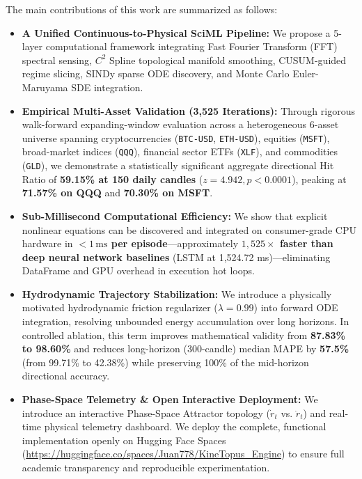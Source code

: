 \documentclass[11pt,a4paper]{article}
\begin{document}
The main contributions of this work are summarized as follows:
\begin{itemize}[leftmargin=1.5em]
    \item \textbf{A Unified Continuous-to-Physical SciML Pipeline:} We propose a 5-layer computational framework integrating Fast Fourier Transform (FFT) spectral sensing, $C^2$ Spline topological manifold smoothing, CUSUM-guided regime slicing, SINDy sparse ODE discovery, and Monte Carlo Euler-Maruyama SDE integration.
    \item \textbf{Empirical Multi-Asset Validation (3,525 Iterations):} Through rigorous walk-forward expanding-window evaluation across a heterogeneous 6-asset universe spanning cryptocurrencies (\texttt{BTC-USD}, \texttt{ETH-USD}), equities (\texttt{MSFT}), broad-market indices (\texttt{QQQ}), financial sector ETFs (\texttt{XLF}), and commodities (\texttt{GLD}), we demonstrate a statistically significant aggregate directional Hit Ratio of \textbf{59.15\% at 150 daily candles} ($z = 4.942, p < 0.0001$), peaking at \textbf{71.57\% on QQQ} and \textbf{70.30\% on MSFT}.
    \item \textbf{Sub-Millisecond Computational Efficiency:} We show that explicit nonlinear equations can be discovered and integrated on consumer-grade CPU hardware in \textbf{$<1\,\text{ms}$ per episode}---approximately \textbf{$1,525\times$ faster than deep neural network baselines} (LSTM at 1,524.72 ms)---eliminating DataFrame and GPU overhead in execution hot loops.
    \item \textbf{Hydrodynamic Trajectory Stabilization:} We introduce a physically motivated hydrodynamic friction regularizer ($\lambda = 0.99$) into forward ODE integration, resolving unbounded energy accumulation over long horizons. In controlled ablation, this term improves mathematical validity from \textbf{87.83\% to 98.60\%} and reduces long-horizon (300-candle) median MAPE by \textbf{57.5\%} (from 99.71\% to 42.38\%) while preserving 100\% of the mid-horizon directional accuracy.
    \item \textbf{Phase-Space Telemetry \& Open Interactive Deployment:} We introduce an interactive Phase-Space Attractor topology ($\dot{r}_t$ vs. $\ddot{r}_t$) and real-time physical telemetry dashboard. We deploy the complete, functional implementation openly on Hugging Face Spaces (\url{https://huggingface.co/spaces/Juan778/KineTopus_Engine}) to ensure full academic transparency and reproducible experimentation.
\end{itemize}
\end{document}

